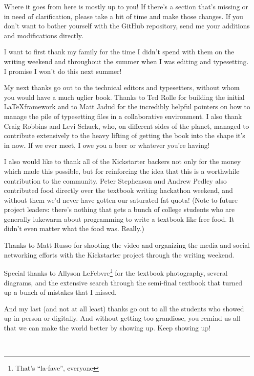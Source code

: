 \documentclass[11pt,final]{book}
\begin{document}
Where it goes from here is mostly up to you!
If there's a section that's missing or in need of clarification, please take a bit of time and make those changes.
If you don't want to bother yourself with the GitHub repository, send me your additions and modifications directly.

I want to first thank my family for the time I didn't spend with them on the writing weekend and throughout the summer when I was editing and typesetting. I promise I won't do this next summer!

My next thanks go out to the technical editors and typesetters, without whom you would have a much uglier book.
Thanks to Ted Rolle for building the initial \LaTeX framework and to Matt Jadud for the incredibly helpful pointers on how to manage the pile of typesetting files in a collaborative environment. I also thank Craig Robbins and Levi Schuck, who, on different sides of the planet, managed to contribute extensively to the heavy lifting of getting the book into the shape it's in now. If we ever meet, I owe you a beer or whatever you're having!

I also would like to thank all of the Kickstarter backers not only for the money which made this possible, but for reinforcing the idea that this is a worthwhile contribution to the community. Peter Stephenson and Andrew Pedley also contributed food directly over the textbook writing hackathon weekend, and without them we'd never have gotten our saturated fat quota! (Note to future project leaders: there's nothing that gets a bunch of college students who are generally lukewarm about programming to write a textbook like free food. It didn't even matter what the food was. Really.)

Thanks to Matt Russo for shooting the video and organizing the media and social networking efforts with the Kickstarter project through the writing weekend.

Special thanks to Allyson LeFebvre\footnote{That's ``la-fave'', everyone} for the textbook photography, several diagrams, and the extensive search through the semi-final textbook that turned up a bunch of mistakes that I missed.

And my last (and not at all least) thanks go out to all the students who showed up in person or digitally. And without getting too grandiose, you remind us all that we can make the world better by showing up. Keep showing up!

~ \linebreak
\end{document}
